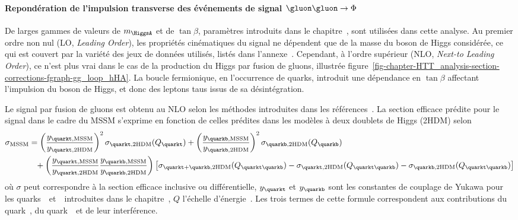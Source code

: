 \paragraph{Repondération de l'impulsion transverse des événements de signal $\gluon\gluon\to\Phi$}
De larges gammes de valeurs de $m_{\HiggsA}$ et de $\tan\beta$, paramètres introduits dans le chapitre~, sont utilisées dans cette analyse.
Au premier ordre non nul (LO, \emph{Leading Order}), les propriétés cinématiques du signal ne dépendent que de la masse du boson de Higgs considérée, ce qui est couvert par la variété des jeux de données utilisés, listés dans l'annexe~.
Cependant, à l'ordre supérieur (NLO, \emph{Next-to Leading Order}), ce n'est plus vrai dans le cas de la production du Higgs par fusion de gluons, illustrée figure~\ref{fig-chapter-HTT_analysis-section-corrections-fgraph-gg_loop_hHA}.
La boucle fermionique, en l'occurrence de quarks, introduit une dépendance en $\tan\beta$ affectant l'impulsion du boson de Higgs, et donc des leptons taus issus de sa désintégration.
\par
Le signal par fusion de gluons est obtenu au NLO selon les méthodes introduites dans les références~\cite{Bagnaschi:2015qta,Bagnaschi:2015bop}.
La section efficace prédite pour le signal dans le cadre du MSSM s'exprime en fonction de celles prédites dans les modèles à deux doublets de Higgs (2HDM) selon
\begin{align}
\sigma_\text{MSSM} &=
\left(\frac{y_{\quarkt,\text{MSSM}}}{y_{\quarkt,\text{2HDM}}}\right)^2 \sigma_{\quarkt,\text{2HDM}}(Q_{\quarkt})
+
\left(\frac{y_{\quarkb,\text{MSSM}}}{y_{\quarkb,\text{2HDM}}}\right)^2 \sigma_{\quarkb,\text{2HDM}}(Q_{\quarkb})
\nonumber\\&\hphantom{=}
+
\left(\frac{y_{\quarkt,\text{MSSM}}}{y_{\quarkt,\text{2HDM}}}\frac{y_{\quarkb,\text{MSSM}}}{y_{\quarkb,\text{2HDM}}}\right)
\left[ \sigma_{\quarkt+\quarkb,\text{2HDM}}(Q_{\quarkt\quarkb}) - \sigma_{\quarkt,\text{2HDM}}(Q_{\quarkt\quarkb}) - \sigma_{\quarkb,\text{2HDM}}(Q_{\quarkt\quarkb}) \right]
\label{eq-2HDM_to_MSSM_xsec}
\end{align}
où $\sigma$ peut correspondre à la section efficace inclusive ou différentielle,
$y_{\quarkt}$ et $y_{\quarkb}$ sont les constantes de couplage de Yukawa pour les quarks~\quarkt\ et~\quarkb\ introduites dans le chapitre~,
$Q$ l'échelle d'énergie~\cite{Bagnaschi:2015qta,Bagnaschi:2015bop}.
Les trois termes de cette formule correspondent aux contributions du quark~\quarkt, du quark~\quarkb\ et de leur interférence.
